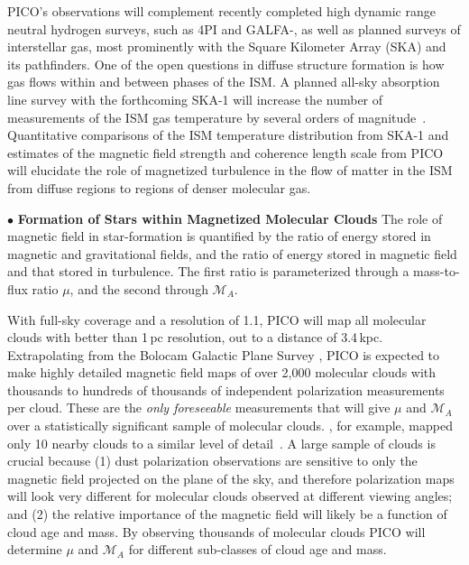 \documentclass[PICOReport.tex]{subfiles}
\begin{document}
PICO's observations will complement recently completed high dynamic range neutral hydrogen surveys, such as \HI4PI \citep{HI4PI:2016} and GALFA-\hi \citep{Peek:2018}, as well as planned surveys of interstellar gas, most prominently with the Square Kilometer Array (SKA) and its pathfinders. One of the open questions in diffuse structure formation is how gas flows within and between phases of the \ac{ISM}. A planned all-sky absorption line survey with the forthcoming SKA-1 will increase the number of measurements of the \ac{ISM} gas temperature by several orders of magnitude~\citep{McClure-Griffiths2015}. Quantitative comparisons of the \ac{ISM} temperature distribution from SKA-1 and estimates of the magnetic field strength and coherence length scale from PICO will elucidate the role of magnetized turbulence in the flow of matter in the \ac{ISM} from diffuse regions to regions of denser molecular gas.

\noindent$\bullet$ {\bf Formation of Stars within Magnetized Molecular Clouds} \hspace{0.1in}
The role of magnetic field in star-formation is quantified by the ratio of energy stored in magnetic and gravitational fields, and the ratio of energy stored in magnetic field and that stored in turbulence. The first ratio is parameterized through a mass-to-flux ratio $\mu$, and the second
through $\mathcal{M}_A$. 

With full-sky coverage and a resolution of 1.1\arcmin, PICO will map all molecular clouds with better than 1\,pc resolution, out to a distance of 3.4\,kpc.  Extrapolating from the Bolocam Galactic Plane Survey \citep[BGPS,][]{EllsworthBowers2015}, PICO is expected to make highly detailed magnetic field maps of over 2,000 molecular clouds with thousands to hundreds of thousands of independent polarization measurements per cloud. These are the {\it only foreseeable} measurements that will give $\mu$ and $\mathcal{M}_A$ over a statistically significant sample of molecular clouds. \planck , for example, mapped only 10 nearby clouds to a similar level of detail~\citep{Planck:XXXV}. A large sample of clouds is crucial because (1) dust polarization observations are sensitive to only the magnetic field projected on the plane of the sky, and therefore polarization maps will look very different for molecular clouds observed at different viewing angles; and (2) the relative importance of the magnetic field will likely be a function of cloud age and mass. By observing thousands of molecular clouds PICO will determine $\mu$ and  $\mathcal{M}_A$ for different sub-classes of cloud age and mass. 
\end{document}
